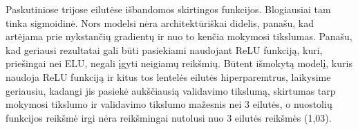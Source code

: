 \documentclass{VUMIFPSbakalaurinis}
\begin{document}
Paskutiniose trijose eilutėse išbandomos skirtingos funkcijos. Blogiausiai
tam tinka sigmoidinė. Nors modelsi nėra architektūriškai didelis,
panašu, kad artėjama prie nykstančių gradientų ir nuo to kenčia
mokymosi tikslumas. Panašu, kad geriausi rezultatai gali būti pasiekiami
naudojant ReLU funkciją, kuri, priešingai nei ELU, negali įgyti neigiamų reikšmių.
Būtent išmokytą modelį, kuris naudoja ReLU funkciją ir kitus tos lentelės eilutės
hiperparemtrus, laikysime geriausiu, kadangi jis pasiekė aukščiausią validavimo
tikslumą, skirtumas tarp mokymosi tikslumo ir validavimo tikslumo mažesnis nei 
3 eilutės, o nuostolių funkcijos reikšmė irgi nėra reikšmingai nutolusi nuo 3
eilutės reikšmės (1,03).


\end{document}
